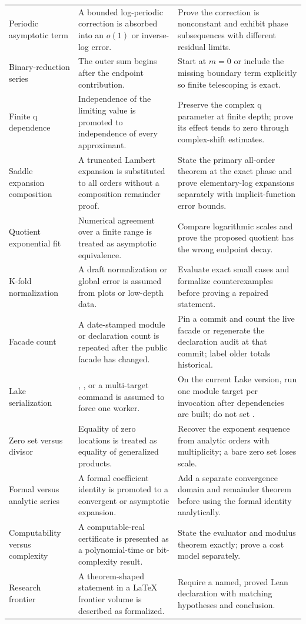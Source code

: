 \documentclass[11pt,oneside]{report}
\theoremstyle{definition}
\theoremstyle{remark}
\DeclareRobustCommand{\lean}[1]{\texorpdfstring{\texttt{\expandafter\seqsplit\expandafter{\detokenize{#1}}}}{\detokenize{#1}}}
\begin{document}
\begin{longtable}{>{\raggedright\arraybackslash}p{} >{\raggedright\arraybackslash}p{} >{\raggedright\arraybackslash}p{}}
Periodic asymptotic term & A bounded log-periodic correction is absorbed into an \(o(1)\) or inverse-log error. & Prove the correction is nonconstant and exhibit phase subsequences with different residual limits. \\
Binary-reduction series & The outer sum begins after the endpoint contribution. & Start at \(m=0\) or include the missing boundary term explicitly so finite telescoping is exact. \\
Finite q dependence & Independence of the limiting value is promoted to independence of every approximant. & Preserve the complex q parameter at finite depth; prove its effect tends to zero through complex-shift estimates. \\
Saddle expansion composition & A truncated Lambert expansion is substituted to all orders without a composition remainder proof. & State the primary all-order theorem at the exact phase and prove elementary-log expansions separately with implicit-function error bounds. \\
Quotient exponential fit & Numerical agreement over a finite range is treated as asymptotic equivalence. & Compare logarithmic scales and prove the proposed quotient has the wrong endpoint decay. \\
K-fold normalization & A draft normalization or global error is assumed from plots or low-depth data. & Evaluate exact small cases and formalize counterexamples before proving a repaired statement. \\
Facade count & A date-stamped module or declaration count is repeated after the public facade has changed. & Pin a commit and count the live facade or regenerate the declaration audit at that commit; label older totals historical. \\
Lake serialization & \lean{LAKE_JOBS=1}, \lean{-j1}, or a multi-target command is assumed to force one worker. & On the current Lake version, run one module target per invocation after dependencies are built; do not set \lean{LEAN_NUM_THREADS=0}. \\
Zero set versus divisor & Equality of zero locations is treated as equality of generalized products. & Recover the exponent sequence from analytic orders with multiplicity; a bare zero set loses scale. \\
Formal versus analytic series & A formal coefficient identity is promoted to a convergent or asymptotic expansion. & Add a separate convergence domain and remainder theorem before using the formal identity analytically. \\
Computability versus complexity & A computable-real certificate is presented as a polynomial-time or bit-complexity result. & State the evaluator and modulus theorem exactly; prove a cost model separately. \\
Research frontier & A theorem-shaped statement in a LaTeX frontier volume is described as formalized. & Require a named, proved Lean declaration with matching hypotheses and conclusion. \\
\bottomrule
\end{longtable}
\end{document}
